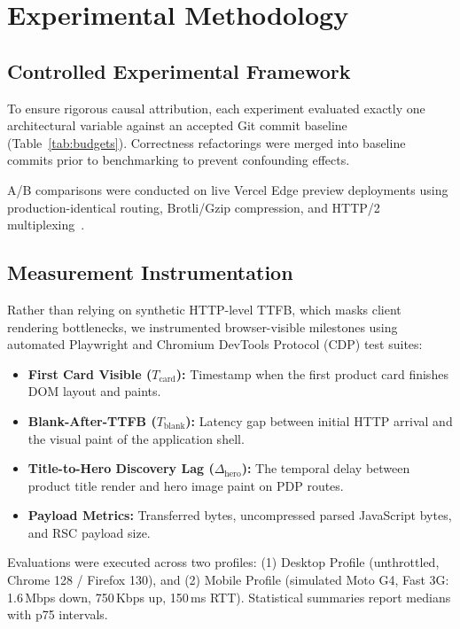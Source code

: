 \documentclass[conference]{IEEEtran}
\begin{document}
\section{Experimental Methodology}
\subsection{Controlled Experimental Framework}
To ensure rigorous causal attribution, each experiment evaluated exactly one architectural variable against an accepted Git commit baseline (Table~\ref{tab:budgets}). Correctness refactorings were merged into baseline commits prior to benchmarking to prevent confounding effects.

A/B comparisons were conducted on live Vercel Edge preview deployments using production-identical routing, Brotli/Gzip compression, and HTTP/2 multiplexing~\cite{rfc9114http3}.

\subsection{Measurement Instrumentation}
Rather than relying on synthetic HTTP-level TTFB, which masks client rendering bottlenecks, we instrumented browser-visible milestones using automated Playwright and Chromium DevTools Protocol (CDP) test suites:
\begin{itemize}
    \item \textbf{First Card Visible ($T_{\text{card}}$):} Timestamp when the first product card finishes DOM layout and paints.
    \item \textbf{Blank-After-TTFB ($T_{\text{blank}}$):} Latency gap between initial HTTP arrival and the visual paint of the application shell.
    \item \textbf{Title-to-Hero Discovery Lag ($\Delta_{\text{hero}}$):} The temporal delay between product title render and hero image paint on PDP routes.
    \item \textbf{Payload Metrics:} Transferred bytes, uncompressed parsed JavaScript bytes, and RSC payload size.
\end{itemize}

Evaluations were executed across two profiles: (1) Desktop Profile (unthrottled, Chrome 128 / Firefox 130), and (2) Mobile Profile (simulated Moto G4, Fast 3G: 1.6\,Mbps down, 750\,Kbps up, 150\,ms RTT). Statistical summaries report medians with p75 intervals.
\end{document}
